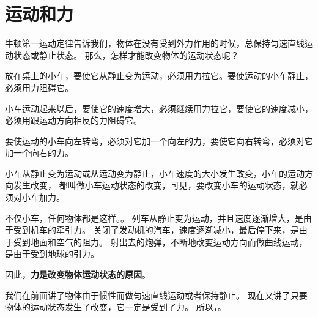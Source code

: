 \section{运动和力}\label{sec:3-8}

牛顿第一运动定律告诉我们，物体在没有受到外力作用的时候，总保持匀速直线运动状态或静止状态。
那么，怎样才能改变物体的运动状态呢？

放在桌上的小车，要使它从静止变为运动，必须用力拉它。要使运动的小车静止，必须用力阻碍它。

小车运动起来以后，要使它的速度增大，必须继续用力拉它，要使它的速度减小，必须用跟运动方向相反的力阻碍它。

要使运动的小车向左转弯，必须对它加一个向左的力，要使它向右转弯，必须对它加一个向右的力。

小车从静止变为运动或从运动变为静止，小车速度的大小发生改变，小车的运动方向发生改变，
都叫做小车运动状态的改变，可见，要改变小车的运动状态，就必须对小车加力。

不仅小车，任何物体都是这样。。
列车从静止变为运动，并且速度逐渐增大，是由于受到机车的牵引力。
关闭了发动机的汽车，速度逐渐减小，最后停下来，是由于受到地面和空气的阻力。
射出去的炮弹，不断地改变运动方向而做曲线运动，是由于受到地球的引力。

因此，\textbf{力是改变物体运动状态的原因}。

我们在前面讲了物体由于惯性而做匀速直线运动或者保持静止。
现在又讲了只要物体的运动状态发生了改变，它一定是受到了力。
所以，。

